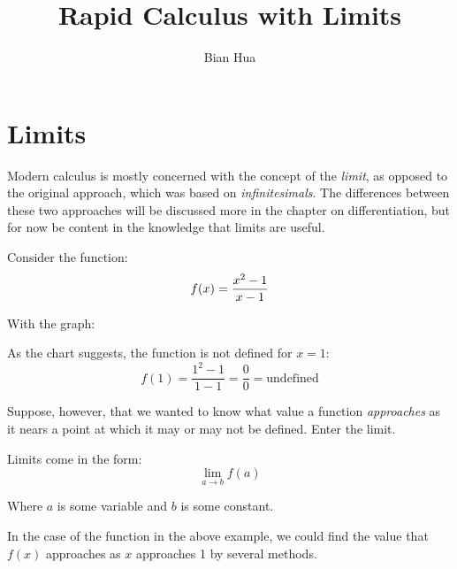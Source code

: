 \documentclass[10pt,a4paper]{book}
\author{Bian Hua}
\title{Rapid Calculus with Limits}
\begin{document}
\maketitle
\tableofcontents

\chapter{Limits}
Modern calculus is mostly concerned with the concept of the \textit{limit}, as opposed to the
original approach, which was based on \textit{infinitesimals}. The differences between these
two approaches will be discussed more in the chapter on differentiation, but for now be content
in the knowledge that limits are useful.

Consider the function:
\[
	f(x)= {{x^2-1}\over{x-1}}
\]

With the graph:


As the chart suggests, the function is not defined for $x=1$:
\[
f(1)= {\frac{1^2-1}{1-1}} = {\frac{0}{0}} = \text{undefined}
\]

Suppose, however, that we wanted to know what value a function \textit{approaches} as it nears
a point at which it may or may not be defined. Enter the limit.

Limits come in the form:
\[
\lim_{a \to b} f(a)
\]

Where $a$ is some variable and $b$ is some constant.

In the case of the function in the above example, we could find the value that $f(x)$ approaches
as $x$ approaches 1 by several methods.
\newline
\end{document}
